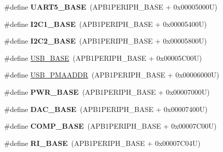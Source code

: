 \begin{DoxyCompactItemize}
\item 
\hypertarget{group___peripheral__memory__map_gaa155689c0e206e6994951dc3cf31052a}{\#define {\bfseries U\-A\-R\-T5\-\_\-\-B\-A\-S\-E}~(A\-P\-B1\-P\-E\-R\-I\-P\-H\-\_\-\-B\-A\-S\-E + 0x00005000\-U)}\label{group___peripheral__memory__map_gaa155689c0e206e6994951dc3cf31052a}

\item 
\hypertarget{group___peripheral__memory__map_gacd72dbffb1738ca87c838545c4eb85a3}{\#define {\bfseries I2\-C1\-\_\-\-B\-A\-S\-E}~(A\-P\-B1\-P\-E\-R\-I\-P\-H\-\_\-\-B\-A\-S\-E + 0x00005400\-U)}\label{group___peripheral__memory__map_gacd72dbffb1738ca87c838545c4eb85a3}

\item 
\hypertarget{group___peripheral__memory__map_ga04bda70f25c795fb79f163b633ad4a5d}{\#define {\bfseries I2\-C2\-\_\-\-B\-A\-S\-E}~(A\-P\-B1\-P\-E\-R\-I\-P\-H\-\_\-\-B\-A\-S\-E + 0x00005800\-U)}\label{group___peripheral__memory__map_ga04bda70f25c795fb79f163b633ad4a5d}

\item 
\#define \hyperlink{group___peripheral__memory__map_gaa6c4cbed4ddbb3ecd77de93fab2a2e04}{U\-S\-B\-\_\-\-B\-A\-S\-E}~(A\-P\-B1\-P\-E\-R\-I\-P\-H\-\_\-\-B\-A\-S\-E + 0x00005\-C00\-U)
\item 
\#define \hyperlink{group___peripheral__memory__map_gaf992dfdd5707568c5cb5506e2347e808}{U\-S\-B\-\_\-\-P\-M\-A\-A\-D\-D\-R}~(A\-P\-B1\-P\-E\-R\-I\-P\-H\-\_\-\-B\-A\-S\-E + 0x00006000\-U)
\item 
\hypertarget{group___peripheral__memory__map_gac691ec23dace8b7a649a25acb110217a}{\#define {\bfseries P\-W\-R\-\_\-\-B\-A\-S\-E}~(A\-P\-B1\-P\-E\-R\-I\-P\-H\-\_\-\-B\-A\-S\-E + 0x00007000\-U)}\label{group___peripheral__memory__map_gac691ec23dace8b7a649a25acb110217a}

\item 
\hypertarget{group___peripheral__memory__map_gad18d0b914c7f68cecbee1a2d23a67d38}{\#define {\bfseries D\-A\-C\-\_\-\-B\-A\-S\-E}~(A\-P\-B1\-P\-E\-R\-I\-P\-H\-\_\-\-B\-A\-S\-E + 0x00007400\-U)}\label{group___peripheral__memory__map_gad18d0b914c7f68cecbee1a2d23a67d38}

\item 
\hypertarget{group___peripheral__memory__map_gaa9f5d2999c6918e385d7a526c4f6b1d3}{\#define {\bfseries C\-O\-M\-P\-\_\-\-B\-A\-S\-E}~(A\-P\-B1\-P\-E\-R\-I\-P\-H\-\_\-\-B\-A\-S\-E + 0x00007\-C00\-U)}\label{group___peripheral__memory__map_gaa9f5d2999c6918e385d7a526c4f6b1d3}

\item 
\hypertarget{group___peripheral__memory__map_ga8fdc749e6f184b3cd9b01f179af62e4c}{\#define {\bfseries R\-I\-\_\-\-B\-A\-S\-E}~(A\-P\-B1\-P\-E\-R\-I\-P\-H\-\_\-\-B\-A\-S\-E + 0x00007\-C04\-U)}\label{group___peripheral__memory__map_ga8fdc749e6f184b3cd9b01f179af62e4c}


\end{DoxyCompactItemize}

